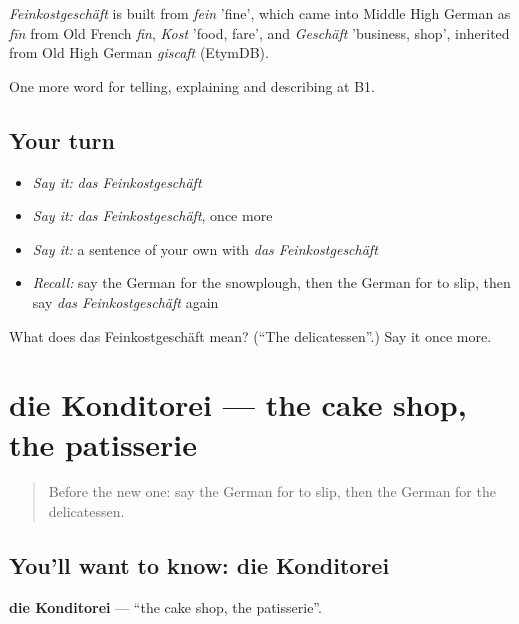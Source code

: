 \begin{cousinweb}
\emph{Feinkostgeschäft} is built from \emph{fein} 'fine', which came into Middle High German as \emph{fīn} from Old French \emph{fin}, \emph{Kost} 'food, fare', and \emph{Geschäft} 'business, shop', inherited from Old High German \emph{giscaft} (EtymDB).
\end{cousinweb}

\begin{grammarlens}[title={What you've built}]
One more word for telling, explaining and describing at B1.
\end{grammarlens}

\subsection*{Your turn}
\begin{itemize}
\raggedright
  \item \emph{Say it:} \emph{das Feinkostgeschäft}
  \item \emph{Say it:} \emph{das Feinkostgeschäft}, once more
  \item \emph{Say it:} a sentence of your own with \emph{das Feinkostgeschäft}
  \item \emph{Recall:} say the German for the snowplough, then the German for to slip, then say \emph{das Feinkostgeschäft} again
\end{itemize}

\begin{tcolorbox}[breakable,colback=teal!4,colframe=teal!35!black,title={Before you move on}]
What does das Feinkostgeschäft mean? (\textquotedblleft{}The delicatessen\textquotedblright{}.) Say it once more.
\end{tcolorbox}
\section[die Konditorei]{die Konditorei — the cake shop, the patisserie}

\label{lesson:GE-C443-konditorei}



\begin{quote}
Before the new one: say the German for to slip, then the German for the delicatessen.
\end{quote}

\subsection*{You'll want to know: die Konditorei}
\textbf{die Konditorei} — \textquotedblleft{}the cake shop, the patisserie\textquotedblright{}.

